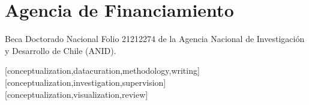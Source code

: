 \documentclass[spanish]{textolivre}
\begin{document}
\section*{Agencia de Financiamiento}
Beca Doctorado Nacional Folio 21212274 de la Agencia Nacional de Investigación y Desarrollo de Chile (ANID).


\printbibliography\label{sec-bib}


\begin{contributors}
[conceptualization,datacuration,methodology,writing]
[conceptualization,investigation,supervision]
[conceptualization,visualization,review]
\end{contributors}
\end{document}
